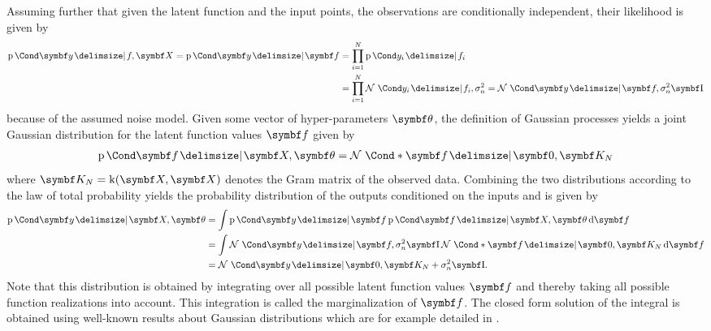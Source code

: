 Assuming further that given the latent function and the input points, the observations are conditionally independent, their likelihood is given by
\begin{align}
    \begin{split}
        \Prob{\mat{y} \given f, \mat{X}} = \Prob{\mat{y} \given \mat{f}} &= \prod_{i = 1}^N \Prob{y_i \given f_i} \\
        &= \prod_{i = 1}^N \Gaussian{y_i \given f_i, \sigma_n^2} = \Gaussian{\mat{y} \given \mat{f}, \sigma_n^2 \Eye}
    \end{split}
\end{align}
because of the assumed noise model.
Given some vector of hyper-parameters $\mat{\theta}$, the definition of Gaussian processes yields a joint Gaussian distribution for the latent function values $\mat{f}$ given by
\begin{align}
    \Prob{\mat{f} \given \mat{X}, \mat{\theta}} = \Gaussian*{\mat{f} \given \mat{0}, \mat{K_N}}
\end{align}
where $\mat{K_N} = \K(\mat{X}, \mat{X})$ denotes the Gram matrix of the observed data.
Combining the two distributions according to the law of total probability yields the probability distribution of the outputs conditioned on the inputs and is given by
\begin{align}
    \begin{split}
        \label{eq:gp:gp_marginal_likelihood}
        \Prob{\mat{y} \given \mat{X}, \mat{\theta}} &= \int \Prob{\mat{y} \given \mat{f}} \Prob{\mat{f} \given \mat{X}, \mat{\theta}} \diff \mat{f} \\
        &= \int \Gaussian{\mat{y} \given \mat{f}, \sigma_n^2 \Eye} \Gaussian*{\mat{f} \given \mat{0}, \mat{K_N}} \diff \mat{f} \\
        &= \Gaussian{\mat{y} \given \mat{0}, \mat{K_N} + \sigma_n^2 \Eye}.
    \end{split}
\end{align}
Note that this distribution is obtained by integrating over all possible latent function values $\mat{f}$ and thereby taking all possible function realizations into account.
This integration is called the marginalization of $\mat{f}$.
The closed form solution of the integral is obtained using well-known results about Gaussian distributions which are for example detailed in \cite{petersen_matrix_2008}.

